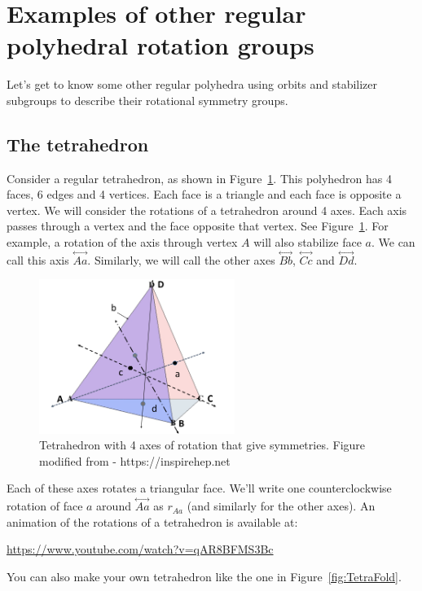 \section{Examples of other regular polyhedral rotation groups}
Let's get to know some other regular polyhedra using orbits and stabilizer subgroups to describe their rotational symmetry groups.
\subsection{The tetrahedron}
Consider a regular tetrahedron, as shown in Figure~\ref {fig:TetRot}. This polyhedron has 4 faces, 6 edges and 4 vertices.  Each face is a triangle and each face is opposite a vertex. We will consider the rotations of a tetrahedron around 4 axes.  Each axis passes through a vertex and the face opposite that vertex. See Figure~\ref {fig:TetRot}. For example, a rotation of the axis through vertex $A$ will also stabilize face $a$.  We can call this axis $\overset{\leftrightarrow}{Aa}$.  Similarly, we will call the other axes $\overset{\leftrightarrow}{Bb}$, $\overset{\leftrightarrow}{Cc}$ and $\overset{\leftrightarrow}{Dd}$.

\begin{figure}[ht]
\begin{center}
\includegraphics[width=2.5in]{images/TetrahedronC.png}
\caption{Tetrahedron with 4 axes of rotation that give symmetries. Figure modified  from - https://inspirehep.net}\label{fig:TetRot}
\end{center}
\end{figure}


Each of these axes rotates a triangular face. We'll write one counterclockwise rotation of face $a$ around $\overset{\leftrightarrow}{Aa}$ as $r_{Aa}$ (and similarly for the other axes).
An animation of the rotations of a tetrahedron is available at:

\url{https://www.youtube.com/watch?v=qAR8BFMS3Bc}

You can also make your own tetrahedron like the one in Figure~\ref{fig:TetraFold}.


